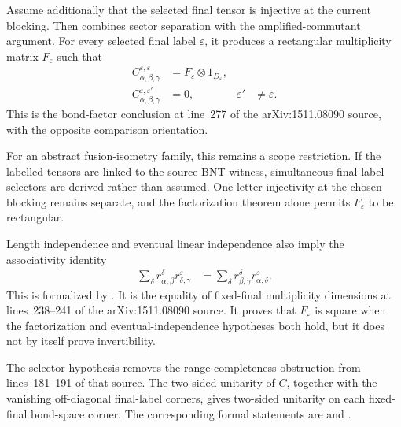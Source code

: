\documentclass{article}
\begin{document}
Assume additionally that the selected final tensor is injective at the
current blocking. Then
combines sector separation with the amplified-commutant argument. For every
selected final label $\varepsilon$, it produces a rectangular multiplicity
matrix $F_\varepsilon$ such that
\begin{align}
    C^{\varepsilon,\varepsilon}_{\alpha,\beta,\gamma}
        &= F_\varepsilon\otimes 1_{D_\varepsilon},
\label{eq:cpgsv17_blocked_chi_uniformity_final_sector_factorization}\\
    C^{\varepsilon,\varepsilon'}_{\alpha,\beta,\gamma}
        &= 0,
&
    \varepsilon'&\ne\varepsilon.
\label{eq:cpgsv17_blocked_chi_uniformity_offdiagonal_final_sector}
\end{align}
This is the bond-factor conclusion at line~277 of the arXiv:1511.08090
source, with the opposite comparison orientation.

For an abstract fusion-isometry family, this remains a scope restriction. If
the labelled tensors are linked to the source BNT witness, simultaneous
final-label selectors are derived rather than assumed. One-letter injectivity
at the chosen blocking remains separate, and the factorization theorem alone
permits $F_\varepsilon$ to be rectangular.

Length independence and eventual linear independence also imply the
associativity identity
\begin{align}
    \sum_\delta
        r_{\alpha,\beta}^{\delta}
        r_{\delta,\gamma}^{\varepsilon}
        &=
        \sum_\delta
        r_{\beta,\gamma}^{\delta}
        r_{\alpha,\delta}^{\varepsilon}.
\label{eq:cpgsv17_blocked_chi_uniformity_multiplicity_associativity}
\end{align}
This is formalized by
.
It is the equality of fixed-final multiplicity dimensions at lines~238--241
of the arXiv:1511.08090 source. It proves that $F_\varepsilon$ is square when
the factorization and eventual-independence hypotheses both hold, but it does
not by itself prove invertibility.

The selector hypothesis removes the range-completeness obstruction from
lines~181--191 of that source. The two-sided unitarity of $C$, together with
the vanishing off-diagonal final-label corners, gives two-sided unitarity on
each fixed-final bond-space corner. The corresponding formal statements are
and
.
\end{document}
